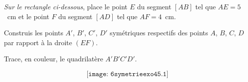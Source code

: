\begin{myenumerate}
  \item {\em Sur le rectangle ci-dessous}, place le point $E$ du
    segment $[AB]$ tel que $AE=5$~cm et le point $F$ du segment $[AD]$
    tel que $AF=4$~cm.
  \item Construis les points $A'$, $B'$, $C'$, $D'$ symétriques
    respectifs des points $A$, $B$, $C$, $D$ par rapport à la droite
    $(EF)$.
  \item Trace, en couleur, le quadrilatère $A'B'C'D'$.
\end{myenumerate}
\[\texttt{[image: 6symetrieexo45.1]}\]
